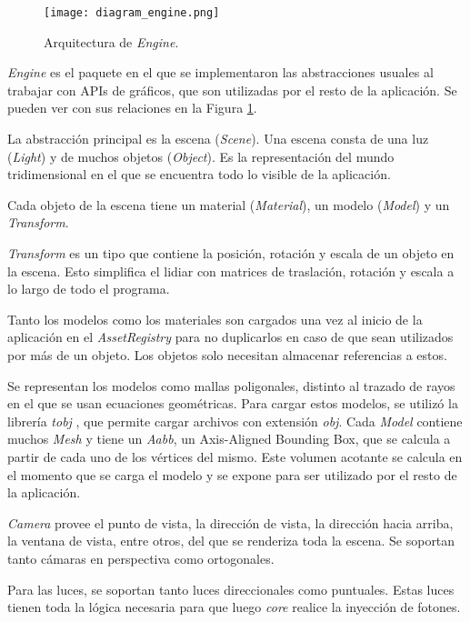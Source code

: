 \begin{figure}[ht]
    \centering
    \texttt{[image: diagram\_engine.png]}
    \caption{Arquitectura de \textit{Engine}.}
    \label{fig:engine_architecture}
\end{figure}

\textit{Engine} es el paquete en el que se implementaron las abstracciones usuales al trabajar con APIs de gráficos, que son utilizadas por el resto de la aplicación.
Se pueden ver con sus relaciones en la Figura \ref{fig:engine_architecture}.

La abstracción principal es la escena (\textit{Scene}).
Una escena consta de una luz (\textit{Light}) y de muchos objetos (\textit{Object}).
Es la representación del mundo tridimensional en el que se encuentra todo lo visible de la aplicación.

Cada objeto de la escena tiene un material (\textit{Material}), un modelo (\textit{Model}) y un \textit{Transform}.

\textit{Transform} es un tipo que contiene la posición, rotación y escala de un objeto en la escena.
Esto simplifica el lidiar con matrices de traslación, rotación y escala a lo largo de todo el programa.

Tanto los modelos como los materiales son cargados una vez al inicio de la aplicación en el \textit{AssetRegistry} para no duplicarlos en caso de que sean utilizados por más de un objeto.
Los objetos solo necesitan almacenar referencias a estos.

Se representan los modelos como mallas poligonales, distinto al trazado de rayos en el que se usan ecuaciones geométricas.
Para cargar estos modelos, se utilizó la librería \textit{tobj} \cite{tobj-crate}, que permite cargar archivos con extensión \textit{obj}.
Cada \textit{Model} contiene muchos \textit{Mesh} y tiene un \textit{Aabb}, un Axis-Aligned Bounding Box, que se calcula a partir de cada uno de los vértices del mismo.
Este volumen acotante se calcula en el momento que se carga el modelo y se expone para ser utilizado por el resto de la aplicación.

\textit{Camera} provee el punto de vista, la dirección de vista, la dirección hacia arriba, la ventana de vista, entre otros, del que se renderiza toda la escena.
Se soportan tanto cámaras en perspectiva como ortogonales.

Para las luces, se soportan tanto luces direccionales como puntuales.
Estas luces tienen toda la lógica necesaria para que luego \textit{core} realice la inyección de fotones.

